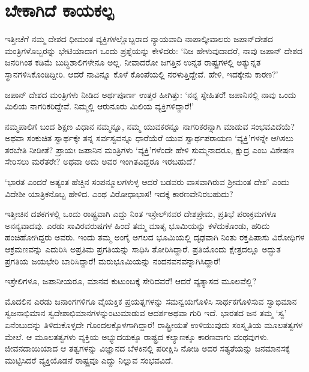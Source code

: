 \section*{ಬೇಕಾಗಿದೆ ಕಾಯಕಲ್ಪ}


ಇತ್ತೀಚೆಗೆ ನಮ್ಮ ದೇಶದ ಧೀಮಂತ ವ್ಯಕ್ತಿಗಳಲ್ಲೊಬ್ಬರಾದ ನ್ಯಾಯವಾದಿ ನಾಪಾಲ್ಕೀವಾಲರು ಜಪಾನ್​ದೇಶದ ಮಂತ್ರಿಗಳೊಬ್ಬರನ್ನು ಭೇಟಿಯಾದಾಗ ಒಂದು ಪ್ರಶ್ನೆಯನ್ನು ಕೇಳಿದರು: ‘ನಿಜ ಹೇಳುವುದಾದರೆ, ನಾವು ಜಪಾನ್ ದೇಶದ ಜನರಿಗಿಂತ ಕಡಿಮೆ ಬುದ್ಧಿಶಾಲಿಗಳೇನೂ ಅಲ್ಲ. ನೀವಾದರೋ ಜಗತ್ತಿನ ಉನ್ನತ ರಾಷ್ಟ್ರಗಳಲ್ಲಿ ಅತ್ಯುನ್ನತ ಸ್ಥಾನಗಳಿಸಿಕೊಂಡಿದ್ದೀರಿ. ಆದರೆ ನಾವಿನ್ನೂ ಕೊಳೆ ಕೊಂಪೆಯಲ್ಲಿ ನರಳುತ್ತಿದ್ದೇವೆ. ಹೇಳಿ, ಇದಕ್ಕೇನು ಕಾರಣ?’

ಜಪಾನ್ ದೇಶದ ಮಂತ್ರಿಗಳು ನೀಡಿದ ಅರ್ಥಪೂರ್ಣ ಉತ್ತರ ಹೀಗಿತ್ತು: ‘ನನ್ನ ಸ್ನೇಹಿತರೆ! ಜಪಾನಿನಲ್ಲಿ ನಾವು ಒಂದು ಮಿಲಿಯ ನಾಗರಿಕರಿದ್ದೇವೆ. ನಿಮ್ಮಲ್ಲಿ ಆರುನೂರು ಮಿಲಿಯ ವ್ಯಕ್ತಿ\-ಗಳಿದ್ದಾರೆ!’

ನಮ್ಮಪಾಲಿಗೆ ಬಂದ ಶಿಕ್ಷಣ ವಿಧಾನ ನಮ್ಮನ್ನೂ, ನಮ್ಮ ಯುವಕರನ್ನೂ ನಾಗರಿಕರನ್ನಾಗಿ ಮಾಡುವ ಸಂಭವವಿದೆಯೆ? ಅಥವಾ ಸಂಕುಚಿತ ಸ್ವಾರ್ಥಕ್ಕೇ ತನ್ನ ಸರ್ವಸ್ವವನ್ನೂ ಧಾರೆಯೆರೆ ಯುವ ಸ್ವಾರ್ಥಪರಾಯಣ ‘ವ್ಯಕ್ತಿ’ಗಳನ್ನೇ ಆಗಿಸಲು ತರಬೇತಿ ನೀಡೀತೆ? ಪ್ರಾಯಃ ಜಪಾನಿನ ಮಂತ್ರಿಗಳು ‘ವ್ಯಕ್ತಿ’ಗಳೆಂದೇ ಹೇಳಿ ಸುಮ್ಮನಾದರೂ, ಕ್ಷುದ್ರ ಎಂಬ ವಿಶೇಷಣ ಸೇರಿಸಲು ಮರೆತರೇ? ಅಥವಾ ಅದು ಅವರ ಇಂಗಿತವಿದ್ದರೂ ಇರಬಹುದೆ?

‘ಭಾರತ ಎಂದರೆ ಅತ್ಯಂತ ಹೆಚ್ಚಿನ ಸಂಪನ್ಮೂಲಗಳುಳ್ಳ ಆದರೆ ಬಡವರು ವಾಸವಾಗಿರುವ ಶ‍್ರೀಮಂತ ದೇಶ’ ಎಂದು ವಿದೇಶೀ ಯಾತ್ರಿಕನೊಬ್ಬ ಹೇಳಿದ. ಎಂಥ ವಿರೋಧಾಭಾಸ! ಇದಕ್ಕೆ ಕಾರಣವೇನಿರಬಹುದು?

ಇತ್ತೀಚಿನ ದಶಕಗಳಲ್ಲಿ ಒಂದು ರಾಷ್ಟ್ರವಾಗಿ ಎದ್ದು ನಿಂತ ಇಸ್ರೇಲ್​ನವರ ದೇಶಪ್ರೇಮ, ಪ್ರತಿಭೆ ಪರಾಕ್ರಮಗಳೂ ಅನನ್ಯವಾದವು. ಎರಡು ಸಾವಿರವರುಷಗಳ ಹಿಂದೆ ತಮ್ಮ ಮಾತೃ ಭೂಮಿಯನ್ನು ಕಳೆದುಕೊಂಡು, ಹರಿದು ಹಂಚಿಹೋಗಿದ್ದರು ಅವರು. ಇಂದು ತಮ್ಮ ಅಂಗೈ ಅಗಲದ ಭೂಮಿಯಲ್ಲಿ ದೃಢವಾಗಿ ನಿಂತು ರಕ್ತಪಿಪಾಸು ವಿರೋಧಿಗಳ ಆಕ್ರಮಣವನ್ನು ಎದುರಿಸಿ ಅಪ್ರತಿಮ ಪ್ರಗತಿಯನ್ನು ಸಾಧಿಸಿ ತೋರಿಸಿದ್ದಾರೆ. ಪ್ರತಿಯೊಂದು ಕ್ಷೇತ್ರದಲ್ಲೂ ಅದ್ಭುತ ಪ್ರಗತಿಯ ಜಯಭೇರಿ ಬಾರಿಸಿದ್ದಾರೆ! ಮರುಭೂಮಿಯನ್ನು ನಂದನವನವನ್ನಾಗಿಸಿದ್ದಾರೆ!

ಇಸ್ರೇಲಿಗಳೂ, ಜಪಾನೀಯರೂ, ಮಾನವ ಕುಟುಂಬಕ್ಕೆ ಸೇರಿದವರೆ! ಆದರೆ ವ್ಯತ್ಯಾಸದ ಮೂಲವೆಲ್ಲಿ?

ಮೊದಲಿನ ಎರಡು ಜನಾಂಗಗಳಿಗೂ ವೈಯಕ್ತಿಕ ಪ್ರಯತ್ನಗಳನ್ನು ಸಮನ್ವಯಗೊಳಿಸಿ ಸಾರ್ಥಕ\-ಗೊಳಿಸುವ ಸ್ವಾಭಿಮಾನ ಸ್ವಜನಾಭಿಮಾನ ಸ್ವದೇಶಾಭಿಮಾನಗಳನ್ನುಂಟುಮಾಡುವ ಆದರ್ಶ\break ಅಥವಾ ಗುರಿ ಇದೆ. ಭಾರತದ ಜನ ತಮ್ಮ ‘ಸ್ವ’ ಏನೆಂಬುದನ್ನು ತಿಳಿದುಕೊಳ್ಳದೇ ಗೊಂದಲಕ್ಕೊಳ\-ಗಾಗಿದ್ದಾರೆ! ರಾಷ್ಟ್ರೀಯತೆ ಉಳಿಯುವುದು ಸಂಸ್ಕೃತಿಯ ಮೂಲತತ್ವಗಳ ಮೇಲೆ. ಆ ಮೂಲತತ್ವಗಳು ವ್ಯಕ್ತಿಯ ಅಭ್ಯುದಯಕ್ಕೂ ರಾಷ್ಟ್ರದ ಕಲ್ಯಾಣಕ್ಕೂ ಕಾರಣವಾಗು ವಂಥವುಗಳು. ಜೀವನದಾಯಿಯಾದ ಆ ತತ್ವಗಳನ್ನು ವಿಜ್ಞಾನದ ಬೆಳಕಿನಲ್ಲಿ ಪರೀಕ್ಷಿಸಿ ನೋಡಿ ಅದರ ಸತ್ಯತೆಯನ್ನು ಜನಮಾನಸಕ್ಕೆ ಮುಟ್ಟಿಸಿದರೆ ವ್ಯಕ್ತಿಯೊಡನೆ ರಾಷ್ಟ್ರವೂ ಎದ್ದು ನಿಲ್ಲುವ ಸಂಭವವಿದೆ.

